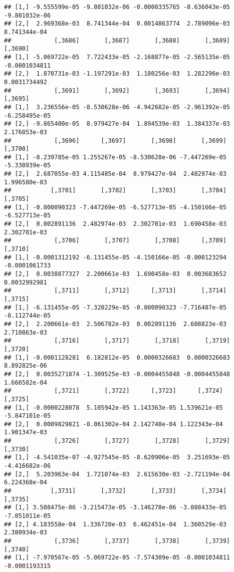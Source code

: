 \documentclass[
]{article}
\begin{document}
\begin{verbatim}
## [1,] -9.555599e-05 -9.801032e-06 -0.0000335765 -8.636043e-05 -9.801032e-06
## [2,]  2.969368e-03  8.741344e-04  0.0014863774  2.789096e-03  8.741344e-04
##            [,3686]       [,3687]       [,3688]       [,3689]       [,3690]
## [1,] -5.069722e-05  7.722433e-05 -2.168877e-05 -2.565135e-05 -0.0001034811
## [2,]  1.870731e-03 -1.197291e-03  1.180256e-03  1.282296e-03  0.0031734492
##            [,3691]       [,3692]       [,3693]       [,3694]       [,3695]
## [1,]  3.236556e-05 -8.530628e-06 -4.942682e-05 -2.961392e-05 -6.258495e-05
## [2,] -9.865400e-05  8.979427e-04  1.894539e-03  1.384337e-03  2.176853e-03
##            [,3696]      [,3697]       [,3698]       [,3699]       [,3700]
## [1,] -8.239785e-05 1.255267e-05 -8.530628e-06 -7.447269e-05 -5.338939e-05
## [2,]  2.687055e-03 4.115485e-04  8.979427e-04  2.482974e-03  1.996580e-03
##           [,3701]       [,3702]       [,3703]       [,3704]       [,3705]
## [1,] -0.000090323 -7.447269e-05 -6.527713e-05 -4.150166e-05 -6.527713e-05
## [2,]  0.002891136  2.482974e-03  2.302701e-03  1.690458e-03  2.302701e-03
##            [,3706]       [,3707]       [,3708]      [,3709]       [,3710]
## [1,] -0.0001312192 -6.131455e-05 -4.150166e-05 -0.000123294 -0.0001061733
## [2,]  0.0038877327  2.200661e-03  1.690458e-03  0.003683652  0.0032992981
##            [,3711]       [,3712]      [,3713]       [,3714]       [,3715]
## [1,] -6.131455e-05 -7.320229e-05 -0.000090323 -7.716487e-05 -8.112744e-05
## [2,]  2.200661e-03  2.506782e-03  0.002891136  2.608823e-03  2.710863e-03
##            [,3716]       [,3717]       [,3718]       [,3719]      [,3720]
## [1,] -0.0001128281  6.182812e-05  0.0000326683  0.0000326683 8.892825e-06
## [2,]  0.0035271874 -1.309525e-03 -0.0004455848 -0.0004455848 1.666582e-04
##            [,3721]       [,3722]      [,3723]      [,3724]       [,3725]
## [1,] -0.0000228078  5.105942e-05 1.143363e-05 1.539621e-05 -5.847101e-05
## [2,]  0.0009829821 -8.061302e-04 2.142748e-04 1.122343e-04  1.901347e-03
##            [,3726]       [,3727]       [,3728]       [,3729]       [,3730]
## [1,] -4.541035e-07 -4.927545e-05 -8.620906e-05  3.251693e-05 -4.416682e-06
## [2,]  5.203963e-04  1.721074e-03  2.615630e-03 -2.721194e-04  6.224368e-04
##           [,3731]       [,3732]       [,3733]       [,3734]       [,3735]
## [1,] 3.508475e-06 -3.215473e-05 -3.146278e-06 -3.088433e-05 -7.051011e-05
## [2,] 4.183558e-04  1.336720e-03  6.462451e-04  1.360529e-03  2.380934e-03
##            [,3736]       [,3737]       [,3738]       [,3739]       [,3740]
## [1,] -7.970567e-05 -5.069722e-05 -7.574309e-05 -0.0001034811 -0.0001193315

\end{verbatim}
\end{document}
